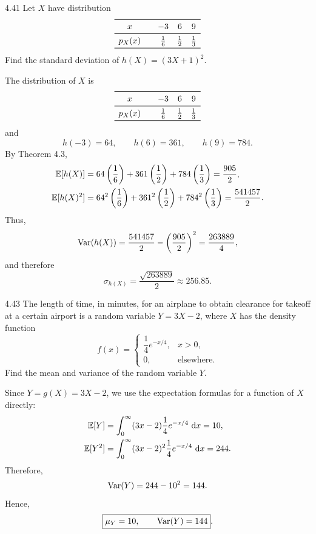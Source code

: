\documentclass[11pt,oneside]{article}
\begin{document}
\begin{exercise}{4.41}
Let $X$ have distribution
\[
\begin{array}{c@{\qquad}ccc}\toprule x&-3&6&9\\\midrule p_X(x)&\frac16&\frac12&\frac13\\\bottomrule\end{array}
\]
Find the standard deviation of $h(X)=(3X+1)^2$.
\end{exercise}

\begin{solution}
The distribution of $X$ is
\[
\begin{array}{c@{\qquad}ccc}
\toprule
x & -3 & 6 & 9 \\
\midrule
p_X(x) & \frac16 & \frac12 & \frac13 \\
\bottomrule
\end{array}
\]
and
\[
    h(-3)=64,\qquad h(6)=361,\qquad h(9)=784.
\]
By Theorem 4.3,
\[
\begin{aligned}
    \mathbb{E}[h(X)]
    &=64\left(\frac16\right)
      +361\left(\frac12\right)
      +784\left(\frac13\right)
      =\frac{905}{2},\\
    \mathbb{E}[h(X)^2]
    &=64^2\left(\frac16\right)
      +361^2\left(\frac12\right)
      +784^2\left(\frac13\right)
      =\frac{541457}{2}.
\end{aligned}
\]
Thus,
\[
    \operatorname{Var}(h(X))
    =\frac{541457}{2}-\left(\frac{905}{2}\right)^2
    =\frac{263889}{4},
\]
and therefore
\[
    \boxed{\sigma_{h(X)}=\frac{\sqrt{263889}}{2}\approx256.85}.
\]
\end{solution}

\begin{exercise}{4.43}
The length of time, in minutes, for an airplane to obtain clearance for takeoff at a certain airport is a random variable $Y=3X-2$, where $X$ has the density function
\[
    f(x)=
    \begin{cases}
        \dfrac14 e^{-x/4}, & x>0,\\
        0, & \text{elsewhere}.
    \end{cases}
\]
Find the mean and variance of the random variable $Y$.
\end{exercise}

\begin{solution}
Since $Y=g(X)=3X-2$, we use the expectation formulas for a function of $X$ directly:
\[
\begin{aligned}
    \mathbb{E}[Y]
    &=\int_0^\infty (3x-2)\frac14e^{-x/4}\,\mathop{}\!\mathrm{d} x
      =10,\\
    \mathbb{E}[Y^2]
    &=\int_0^\infty (3x-2)^2\frac14e^{-x/4}\,\mathop{}\!\mathrm{d} x
      =244.
\end{aligned}
\]
Therefore,
\[
    \operatorname{Var}(Y)=244-10^2=144.
\]
Hence,
\[
    \boxed{\mu_Y=10,\qquad \operatorname{Var}(Y)=144}.
\]
\end{solution}
\end{document}
